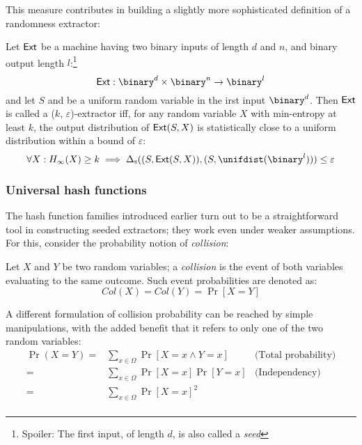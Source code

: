 This measure contributes in building a slightly more sophisticated definition of a randomness extractor:

\begin{definition}
    Let $\textup{\textsf{Ext}}$ be a machine having two binary inputs of length $d$ and $n$, and binary output length $l$:\footnote{Spoiler: The first input, of length $d$, is also called a \emph{seed}}
    \[
        \Extm: \binary^d \times \binary^n \to \binary^l
    \]
    and let $S$ and be a uniform random variable in the irst input $\binary^d$. Then $\textup{\textsf{Ext}}$ is called a ($k$, $\varepsilon$)-extractor iff, for any random variable $X$ with min-entropy at least $k$, the output distribution of $\textup{\textsf{Ext}}(S, X)$ is statistically close to a uniform distribution within a bound of $\varepsilon$:
    \[
        \forall X : H_{\infty}(X) \geq k \implies \statdist((S, \Extm(S, X)), (S, \unifdist(\binary^l))) \leq \varepsilon
    \]
\end{definition}


\subsubsection{Universal hash functions}

The hash function families introduced earlier turn out to be a straightforward tool in constructing seeded extractors; they work even under weaker assumptions. For this, consider the probability notion of \emph{collision}:

\begin{definition}
    Let $X$ and $Y$ be two \iid{} random variables; a \emph{collision} is the event of both variables evaluating to the same outcome. Such event probabilities are denoted as:
    \[
        Col(X) = Col(Y) = \Pr[X = Y]
    \]
\end{definition}

A different formulation of collision probability can be reached by simple manipulations, with the added benefit that it refers to only one of the two \iid{} random variables:
\begin{align*}
    \Pr(X = Y) =& \sum_{x \in \Omega} \Pr[X = x \wedge Y = x] & \text{(Total probability)} \\
               =& \sum_{x \in \Omega} \Pr[X = x] \Pr[Y = x]   & \text{(Independency)}      \\
               =& \sum_{x \in \Omega} \Pr[X = x]^2                                         \\
\end{align*}

